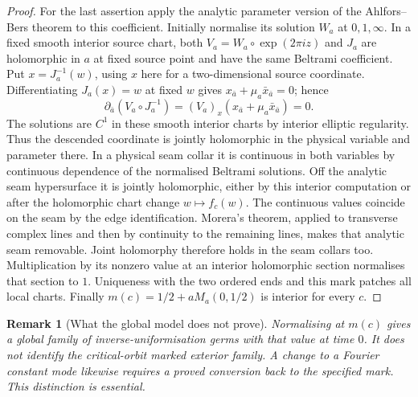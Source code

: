 \documentclass[11pt]{article}
\newtheorem{remark}[theorem]{Remark}
\begin{document}
\begin{proof}
For the last assertion apply the analytic parameter version of the
Ahlfors--Bers theorem to this coefficient. Initially normalise its solution
$W_a$ at $0,1,\infty$. In a fixed smooth interior source chart, both
$V_a=W_a\circ\exp(2\pi iz)$ and $J_a$ are holomorphic in $a$ at fixed source
point and have the same Beltrami coefficient. Put $x=J_a^{-1}(w)$, using
$x$ here for a two-dimensional source coordinate. Differentiating
$J_a(x)=w$ at fixed $w$ gives
$x_{\bar a}+\mu_a\bar x_{\bar a}=0$; hence
\[
 \partial_{\bar a}(V_a\circ J_a^{-1})
 =(V_a)_x(x_{\bar a}+\mu_a\bar x_{\bar a})=0.
\]
The solutions are $C^1$ in these smooth interior charts by interior elliptic
regularity. Thus the descended coordinate is jointly holomorphic in the
physical variable and parameter there. In a physical seam collar it is
continuous in both variables by continuous dependence of the normalised
Beltrami solutions. Off the analytic seam hypersurface it is jointly
holomorphic, either by this interior computation or after the holomorphic
chart change $w\mapsto f_c(w)$. The continuous values coincide on the
seam by the edge identification. Morera's theorem, applied to transverse
complex lines and then by continuity to the remaining lines, makes that
analytic seam removable. Joint holomorphy therefore holds in the seam
collars too. Multiplication by its nonzero value at
an interior holomorphic section normalises that section to $1$.
Uniqueness with the two ordered ends and this mark patches all local charts.
Finally $m(c)=1/2+aM_a(0,1/2)$ is interior for every $c$.
\end{proof}

\begin{remark}[What the global model does not prove]
Normalising at $m(c)$ gives a global family of inverse-uniformisation germs
with that value at time $0$. It does not identify the critical-orbit marked
exterior family. A change to a Fourier constant mode likewise requires a
proved conversion back to the specified mark. This distinction is essential.
\end{remark}
\end{document}
